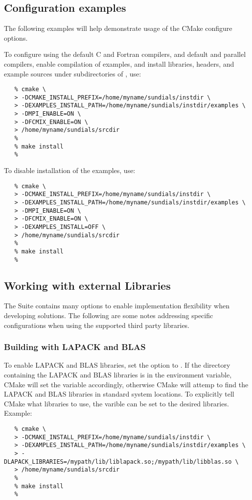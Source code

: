 \subsection{Configuration examples}

The following examples will help demonstrate usage of the CMake configure options.

\noindent To configure {\sundials} using the default C and Fortran compilers,
and default  and  parallel compilers, 
enable compilation of examples, and install libraries, headers, and
example sources under subdirectories of
, use:

\begin{verbatim}
   % cmake \
   > -DCMAKE_INSTALL_PREFIX=/home/myname/sundials/instdir \
   > -DEXAMPLES_INSTALL_PATH=/home/myname/sundials/instdir/examples \
   > -DMPI_ENABLE=ON \
   > -DFCMIX_ENABLE=ON \
   > /home/myname/sundials/srcdir
   %
   % make install
   % 
\end{verbatim}

\noindent To disable installation of the examples, use:
\begin{verbatim}
   % cmake \
   > -DCMAKE_INSTALL_PREFIX=/home/myname/sundials/instdir \
   > -DEXAMPLES_INSTALL_PATH=/home/myname/sundials/instdir/examples \
   > -DMPI_ENABLE=ON \
   > -DFCMIX_ENABLE=ON \
   > -DEXAMPLES_INSTALL=OFF \
   > /home/myname/sundials/srcdir
   %
   % make install
   % 
\end{verbatim}

\subsection{Working with external Libraries}

The {\sundials} Suite contains many options to enable implementation flexibility
when developing solutions. The following are some notes addressing specific configurations
when using the supported third party libraries.

\subsubsection*{Building with LAPACK and BLAS}
To enable LAPACK and BLAS libraries, set the  option to .
If the directory containing the LAPACK and BLAS libraries is in the  environment
variable, CMake will set the  variable accordingly, otherwise CMake
will attemp to find the LAPACK and BLAS libraries in standard system locations.
To explicitly tell CMake what libraries to use, the \id{LAPACK\_LIBRARIES} varible can be
set to the desired libraries.  Example: 
\begin{verbatim}
   % cmake \
   > -DCMAKE_INSTALL_PREFIX=/home/myname/sundials/instdir \
   > -DEXAMPLES_INSTALL_PATH=/home/myname/sundials/instdir/examples \
   > -DLAPACK_LIBRARIES=/mypath/lib/liblapack.so;/mypath/lib/libblas.so \
   > /home/myname/sundials/srcdir
   %
   % make install
   % 
\end{verbatim}


